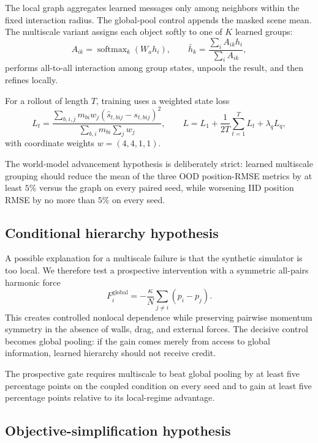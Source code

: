 \documentclass[10pt]{article}
\begin{document}
The local graph aggregates learned messages only among neighbors within the fixed interaction radius. The global-pool control appends the masked scene mean. The multiscale variant assigns each object softly to one of $K$ learned groups:
\begin{equation}
A_{ik} = \operatorname{softmax}_k(W_a h_i),\qquad
\bar h_k =
\frac{\sum_i A_{ik}h_i}{\sum_i A_{ik}},
\end{equation}
performs all-to-all interaction among group states, unpools the result, and then refines locally.

For a rollout of length $T$, training uses a weighted state loss
\begin{equation}
L_t =
\frac{
\sum_{b,i,j}m_{bi}w_j(\hat s_{t,bij}-s_{t,bij})^2
}{
\sum_{b,i}m_{bi}\sum_j w_j
},
\qquad
L=L_1+\frac{1}{2T}\sum_{t=1}^{T}L_t+\lambda_q L_q,
\end{equation}
with coordinate weights $w=(4,4,1,1)$.

The world-model advancement hypothesis is deliberately strict: learned multiscale grouping should reduce the mean of the three OOD position-RMSE metrics by at least $5\%$ versus the graph on every paired seed, while worsening IID position RMSE by no more than $5\%$ on every seed.

\subsection{Conditional hierarchy hypothesis}

A possible explanation for a multiscale failure is that the synthetic simulator is too local. We therefore test a prospective intervention with a symmetric all-pairs harmonic force
\begin{equation}
F_i^{\mathrm{global}}
= -\frac{\kappa}{N}\sum_{j\neq i}(p_i-p_j).
\end{equation}
This creates controlled nonlocal dependence while preserving pairwise momentum symmetry in the absence of walls, drag, and external forces. The decisive control becomes global pooling: if the gain comes merely from access to global information, learned hierarchy should not receive credit.

The prospective gate requires multiscale to beat global pooling by at least five percentage points on the coupled condition on every seed and to gain at least five percentage points relative to its local-regime advantage.

\subsection{Objective-simplification hypothesis}
\end{document}
